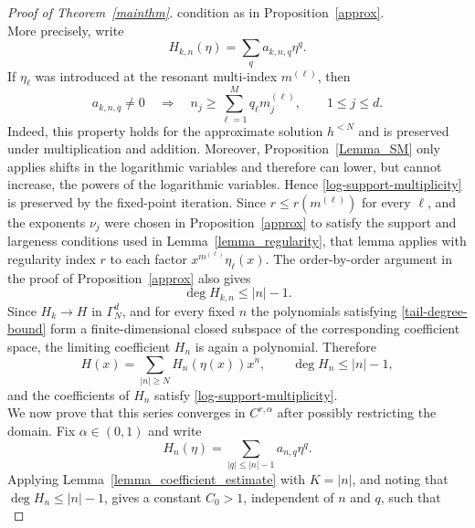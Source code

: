 \documentclass{amsart}
\theoremstyle{plain}
\theoremstyle{definition}
\begin{document}
\begin{proof}[Proof of Theorem~\ref{mainthm}]
condition as in Proposition~\ref{approx}.\\ 
More precisely, write
\begin{equation}
    H_{k,n}(\eta)
    =
    \sum_q a_{k,n,q}\eta^q .
\end{equation}
If $\eta_\ell$ was introduced at the resonant multi-index
$m^{(\ell)}$, then
\begin{equation}
    a_{k,n,q}\neq0
    \quad\Longrightarrow\quad
    n_j\geq
    \sum_{\ell=1}^M q_\ell m_j^{(\ell)},
    \qquad 1\leq j\leq d.
    \label{log-support-multiplicity}
\end{equation}
Indeed, this property holds for the approximate solution
$h^{<N}$ and is preserved under multiplication and addition.
Moreover, Proposition~\ref{Lemma_SM} only applies shifts in the
logarithmic variables and therefore can lower, but cannot increase,
the powers of the logarithmic variables. Hence
\eqref{log-support-multiplicity} is preserved by the fixed-point
iteration. Since $r\le r(m^{(\ell)})$ for every $\ell$, and the exponents $\nu_j$ were chosen in Proposition~\ref{approx} to satisfy the support and largeness conditions used in Lemma~\ref{lemma_regularity}, that lemma applies with regularity index $r$ to each factor $x^{m^{(\ell)}}\eta_\ell(x)$.
The order-by-order argument in the proof of
Proposition~\ref{approx} also gives
\begin{equation}
    \deg H_{k,n}\leq |n|-1.
    \label{tail-degree-bound}
\end{equation}
Since $H_k\to H$ in $\Gamma_N^d$, and for every fixed $n$ the polynomials satisfying \eqref{tail-degree-bound} form a finite-dimensional closed subspace of the corresponding coefficient space, the limiting coefficient $H_n$ is again a polynomial.
Therefore
\begin{equation}
    H(x)
    =
    \sum_{|n|\geq N} H_n(\eta(x))x^n,
    \qquad
    \deg H_n\leq |n|-1,
    \label{polynomial-tail}
\end{equation}
and the coefficients of $H_n$ satisfy
\eqref{log-support-multiplicity}.\\
We now prove that this series converges in $C^{r,\alpha}$ after possibly
restricting the domain. Fix $\alpha\in(0,1)$ and write
\begin{equation}
    H_n(\eta)
    =
    \sum_{|q|\leq |n|-1} a_{n,q}\eta^q.
\end{equation}
Applying Lemma~\ref{lemma_coefficient_estimate} with $K=|n|$, and noting that $\deg H_n\leq |n|-1$, gives a constant $C_0>1$, independent of $n$ and $q$, such that
\begin{equation}

\end{equation}
\end{proof}
\end{document}
